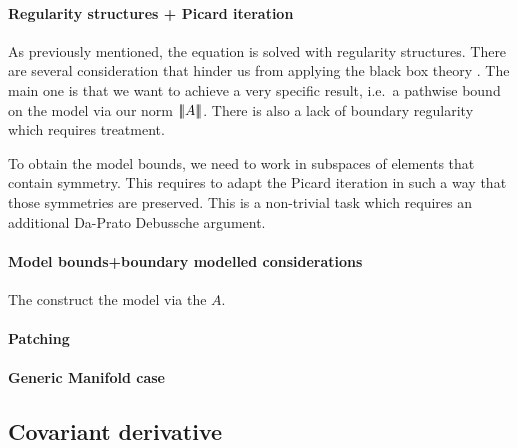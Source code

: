 \documentclass[./Research_statement.tex]{subfiles}
\begin{document}
\paragraph{Regularity structures + Picard iteration}
As previously mentioned, the equation is solved with regularity structures. There are several consideration that hinder us from applying the black box theory . The main one is that we want to achieve a very specific result, i.e.\ a pathwise bound on the model via our norm ${\left\vert\kern-0.4ex\left\vert\kern-0.4ex\left\vert A \right\vert\kern-0.4ex\right\vert\kern-0.4ex\right\vert}$. There is also a lack of boundary regularity which requires treatment. 

To obtain the model bounds, we need to work in subspaces of elements that contain symmetry. This requires to adapt the Picard iteration in such a way that those symmetries are preserved. This is a non-trivial task which requires an additional Da-Prato Debussche argument.

\paragraph{Model bounds+boundary modelled considerations}
The construct the model via the $A$.


\paragraph{Patching}

\paragraph{Generic Manifold case}


\subsection{Covariant derivative}
\end{document}
